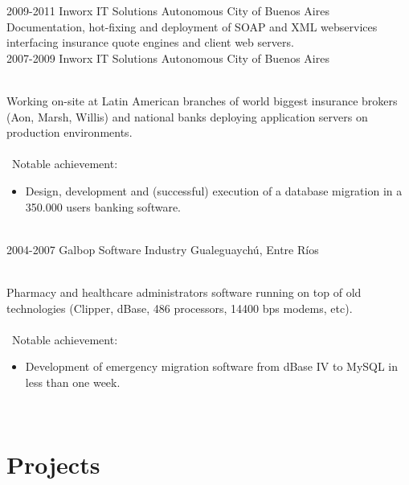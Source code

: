 \documentclass[]{cv-style}          %
\begin{document}
\begin{entrylist}
\entry
  {2009-2011}
  {Inworx IT Solutions}
  {Autonomous City of Buenos Aires}
  {\\
  Documentation, hot-fixing and deployment of SOAP and XML webservices interfacing insurance quote engines and client web servers.
  }\\
\entry
  {2007-2009}
  {Inworx IT Solutions}
  {Autonomous City of Buenos Aires}
  {\\
  Working on-site at Latin American branches of world biggest insurance brokers (Aon, Marsh, Willis) and national banks deploying application servers on production environments.\\\
  \\\
  Notable achievement:
  \begin{itemize}
    \item Design, development and (successful) execution of a database migration in a 350.000 users banking software.
  \end{itemize}
}\\
\entry
  {2004-2007}
  {Galbop Software Industry}
  {Gualeguaychú, Entre Ríos}
  {\\
  Pharmacy and healthcare administrators software running on top of old technologies (Clipper, dBase, 486 processors, 14400 bps modems, etc).\\
  \\\
  Notable achievement:
  \begin{itemize}
  	\item Development of emergency migration software from dBase IV to MySQL in less than one week.
  \end{itemize}
}

\end{entrylist}
\\


{\vspace{+4.5cm}}
\section{Projects}
\end{document}
